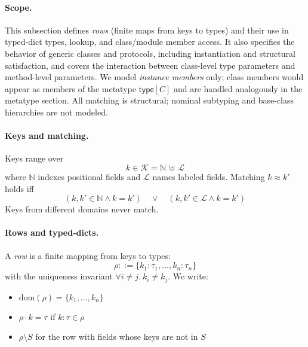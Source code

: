 \paragraph{Scope.}
This subsection defines \emph{rows} (finite maps from keys to types) and their use in typed-dict types, lookup, and class/module member access.
It also specifies the behavior of generic classes and protocols, including instantiation and structural satisfaction, and covers the interaction between class-level type parameters and method-level parameters.
We model \emph{instance members} only; class members would appear as members of the metatype $\mathsf{type}[C]$ and are handled analogously in the metatype section.
All matching is structural; nominal subtyping and base-class hierarchies are not modeled.

\paragraph{Keys and matching.}
Keys range over
\[
k \in \mathcal{K} = \mathbb{N} \,\uplus\, \mathcal{L}
\]
where $\mathbb{N}$ indexes positional fields and $\mathcal{L}$ names labeled fields.
Matching $k \approx k'$ holds iff
\[
(k, k' \in \mathbb{N} \wedge k = k') \quad\lor\quad (k, k' \in \mathcal{L} \wedge k = k')
\]
Keys from different domains never match.

\paragraph{Rows and typed-dicts.}
A \emph{row} is a finite mapping from keys to types:
\[
\rho ::= \{ k_1 : \tau_1, \dots, k_n : \tau_n \}
\]
with the uniqueness invariant $\forall i \neq j.\ k_i \neq k_j$.
We write:
\begin{itemize}
\item $\mathrm{dom}(\rho) = \{ k_1,\dots,k_n \}$
\item $\rho \cdot k = \tau$ if $k:\tau \in \rho$
\item $\rho \setminus S$ for the row with fields whose keys are not in $S$
\end{itemize}

